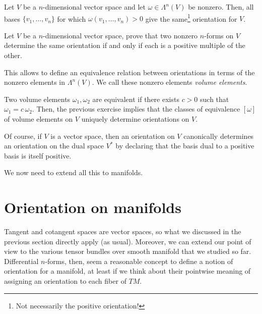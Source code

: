 \begin{lemma}\label{lemma:orient}
  Let $V$ be a $n$-dimensional vector space and let $\omega\in\Lambda^n(V)$ be nonzero.
  Then, all bases $\{v_1, \ldots, v_n\}$ for which $\omega(v_1,\ldots, v_n) > 0$ give the same\footnote{Not necessarily the positive orientation!} orientation for $V$.
\end{lemma}

\begin{exercise}
  Let $V$ be a $n$-dimensional vector space, prove that two nonzero $n$-forms on $V$ determine the same orientation if and only if each is a positive multiple of the other.
\end{exercise}

This allows to define an equivalence relation between orientations in terms of the nonzero elements in $\Lambda^n(V)$. We call these nonzero elements \emph{volume elements}.

Two volume elements $\omega_1, \omega_2$ are equivalent if there exists $c > 0$ such that $\omega_1 = c\, \omega_2$.
Then, the previous exercise implies that the classes of equivalence $[\omega]$ of volume elements on $V$ uniquely determine orientations on $V$.

\begin{remark}
  Of course, if $V$ is a vector space, then an orientation on $V$ canonically determines an orientation on the dual space $V^*$ by declaring that the basis dual to a positive basis is itself positive.
\end{remark}

We now need to extend all this to manifolds.

\section{Orientation on manifolds}
Tangent and cotangent spaces are vector spaces, so what we discussed in the previous section directly apply (as usual).
Moreover, we can extend our point of view to the various tensor bundles over smooth manifold that we studied so far.
Differential $n$-forms, then, seem a reasonable concept to define a notion of orientation for a manifold, at least if we think about their pointwise meaning of assigning an orientation to each fiber of $TM$.

